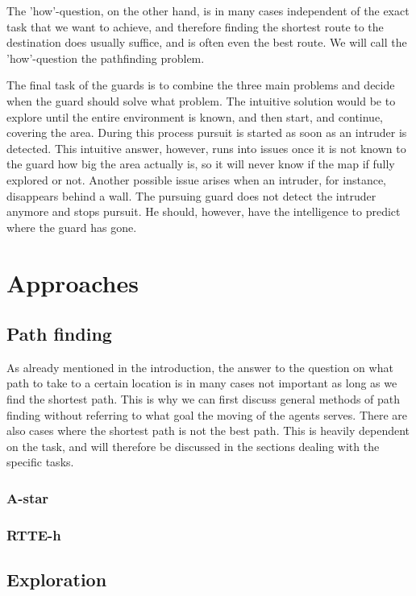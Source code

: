 \documentclass[a4paper]{report}
\begin{document}
	The 'how'-question, on the other hand, is in many cases independent of the exact task that we want to achieve, and therefore finding the shortest route to the destination does usually suffice, and is often even the best route. We will call the 'how'-question the pathfinding problem.

	The final task of the guards is to combine the three main problems and decide when the guard should solve what problem. The intuitive solution would be to explore until the entire environment is known, and then start, and continue, covering the area. During this process pursuit is started as soon as an intruder is detected. This intuitive answer, however, runs into issues once it is not known to the guard how big the area actually is, so it will never know if the map if fully explored or not. Another possible issue arises when an intruder, for instance, disappears behind a wall. The pursuing guard does not detect the intruder anymore and stops pursuit. He should, however, have the intelligence to predict where the guard has gone.

\chapter{Approaches}
	
	\section{Path finding}
		As already mentioned in the introduction, the answer to the question on what path to take to a certain location is in many cases not important as long as we find the shortest path. This is why we can first discuss general methods of path finding without referring to what goal the moving of the agents serves. There are also cases where the shortest path is not the best path. This is heavily dependent on the task, and will therefore be discussed in the sections dealing with the specific tasks.

		\subsection{A-star}
			

		\subsection{RTTE-h}
			

	\section{Exploration}
\end{document}
